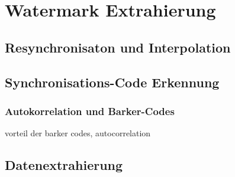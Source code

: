 \section{Watermark Extrahierung}
\label{sec:extraction}


\subsection{Resynchronisaton und Interpolation}

\subsection{Synchronisations-Code Erkennung}

\subsubsection{Autokorrelation und Barker-Codes} 
\label{sec:barkercode}


vorteil der barker codes, autocorrelation

\subsection{Datenextrahierung}



